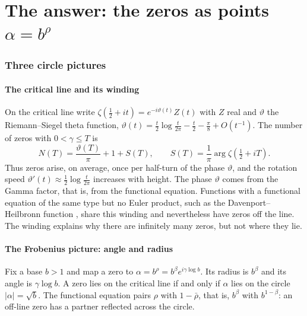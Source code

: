 \documentclass[11pt,a4paper]{article}
\theoremstyle{definition}\newtheorem{definition}[proposition]{Definition}
\theoremstyle{remark}\newtheorem{remark}[proposition]{Remark}
\begin{document}
\part{The answer: the zeros as points \texorpdfstring{$\alpha=b^\rho$}{alpha = b\textasciicircum rho}}

\section{Three circle pictures}\label{sec:pictures}
\subsection{The critical line and its winding}
On the critical line write $\zeta(\tfrac12+it)=e^{-i\vartheta(t)}Z(t)$ with $Z$ real and $\vartheta$ the Riemann--Siegel theta function, $\vartheta(t)=\tfrac t2\log\tfrac t{2\pi}-\tfrac t2-\tfrac\pi8+O(t^{-1})$. The number of zeros with $0<\gamma\le T$ is
\begin{equation}\label{eq:RvM}
N(T)=\frac{\vartheta(T)}{\pi}+1+S(T),\qquad S(T)=\frac1\pi\arg\zeta(\tfrac12+iT).
\end{equation}
Thus zeros arise, on average, once per half-turn of the phase $\vartheta$, and the rotation speed $\vartheta'(t)\approx\frac12\log\frac t{2\pi}$ increases with height. The phase $\vartheta$ comes from the Gamma factor, that is, from the functional equation. Functions with a functional equation of the same type but no Euler product, such as the Davenport--Heilbronn function \cite{DavenportHeilbronn1936}, share this winding and nevertheless have zeros off the line. The winding explains why there are infinitely many zeros, but not where they lie.

\subsection{The Frobenius picture: angle and radius}
Fix a base $b>1$ and map a zero to $\alpha=b^{\rho}=b^{\beta}e^{i\gamma\log b}$. Its radius is $b^{\beta}$ and its angle is $\gamma\log b$. A zero lies on the critical line if and only if $\alpha$ lies on the circle $|\alpha|=\sqrt b$. The functional equation pairs $\rho$ with $1-\bar\rho$, that is, $b^{\beta}$ with $b^{1-\beta}$: an off-line zero has a partner reflected across the circle.
\end{document}
